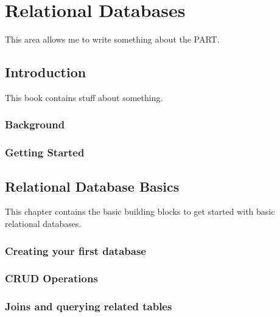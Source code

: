 

\part{Relational Databases}
\label{part:relationaldatabases}
This  area allows me to write something about the PART.

\chapter{Introduction}
\label{chap:relational:introduction}
This book contains stuff about something.

\section{Background}
\section{Getting Started}


\chapter{Relational Database Basics}
\label{chap:relational:relational-database-basics}
This chapter contains the basic building blocks to get started with basic relational databases.

\section{Creating your first database}
\section{CRUD Operations}
\section{Joins and querying related tables}

